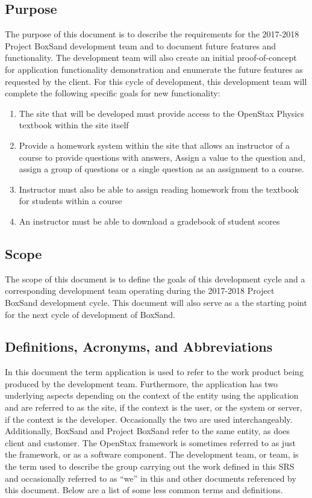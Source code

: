 \documentclass[onecolumn, draftclsnofoot,10pt, compsoc]{IEEEtran}
\begin{document}
\subsection{Purpose}
The purpose of this document is to describe the requirements for the 2017-2018 Project BoxSand development team and to document future features and functionality. The development team will also create an initial proof-of-concept for application functionality demonstration and enumerate the future features as requested by the client. For this cycle of development, this development team will complete the following specific goals for new functionality:
\begin{enumerate}
    \item The site that will be developed must provide access to the OpenStax Physics textbook within the site itself
    \item Provide a homework system within the site that allows an instructor of a course to provide questions with answers, Assign a value to the question and, assign a group of questions or a single question as an assignment to a course.
    \item Instructor must also be able to assign reading homework from the textbook for students within a course
    \item An instructor must be able to download a gradebook of student scores
\end{enumerate}


\subsection{Scope}
The scope of this document is to define the goals of this development cycle and a corresponding development team operating during the 2017-2018 Project BoxSand development cycle. This document will also serve as a the starting point for the next cycle of development of BoxSand.



\subsection{Definitions, Acronyms, and Abbreviations}
In this document the term application is used to refer to the work product being produced by the development team. Furthermore, the application has two underlying aspects depending on the context of the entity using the application and are referred to as the site, if the context is the user, or the system or server, if the context is the developer. Occasionally the two are used interchangeably. Additionally, BoxSand and Project BoxSand refer to the same entity, as does client and customer. The OpenStax framework is sometimes referred to as just the framework, or as a software component. The development team, or team,  is the term used to describe the group carrying out the work defined in this SRS and occasionally referred to as “we” in this and other documents referenced by this document. Below are a list of some less common terms and definitions. 
\end{document}
